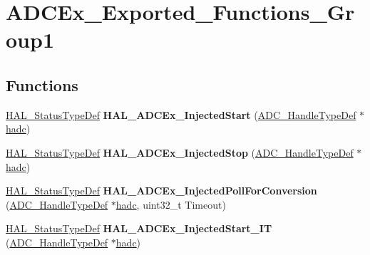 \hypertarget{group___a_d_c_ex___exported___functions___group1}{\section{A\-D\-C\-Ex\-\_\-\-Exported\-\_\-\-Functions\-\_\-\-Group1}
\label{group___a_d_c_ex___exported___functions___group1}
}
\subsection*{Functions}
\begin{DoxyCompactItemize}
\item 
\hypertarget{group___a_d_c_ex___exported___functions___group1_gaa666882ff772df8a5140090422825ed6}{\hyperlink{stm32l1xx__hal__def_8h_a63c0679d1cb8b8c684fbb0632743478f}{H\-A\-L\-\_\-\-Status\-Type\-Def} {\bfseries H\-A\-L\-\_\-\-A\-D\-C\-Ex\-\_\-\-Injected\-Start} (\hyperlink{struct_a_d_c___handle_type_def}{A\-D\-C\-\_\-\-Handle\-Type\-Def} $\ast$\hyperlink{stm32l1xx__it_8c_a62fcafba91cf315db7e0e0c8f22c656f}{hadc})}\label{group___a_d_c_ex___exported___functions___group1_gaa666882ff772df8a5140090422825ed6}

\item 
\hypertarget{group___a_d_c_ex___exported___functions___group1_ga91f6c85ae910e9baaf578a346c30c7c1}{\hyperlink{stm32l1xx__hal__def_8h_a63c0679d1cb8b8c684fbb0632743478f}{H\-A\-L\-\_\-\-Status\-Type\-Def} {\bfseries H\-A\-L\-\_\-\-A\-D\-C\-Ex\-\_\-\-Injected\-Stop} (\hyperlink{struct_a_d_c___handle_type_def}{A\-D\-C\-\_\-\-Handle\-Type\-Def} $\ast$\hyperlink{stm32l1xx__it_8c_a62fcafba91cf315db7e0e0c8f22c656f}{hadc})}\label{group___a_d_c_ex___exported___functions___group1_ga91f6c85ae910e9baaf578a346c30c7c1}

\item 
\hypertarget{group___a_d_c_ex___exported___functions___group1_ga5e11b306be79f36c71a73f2e465ad613}{\hyperlink{stm32l1xx__hal__def_8h_a63c0679d1cb8b8c684fbb0632743478f}{H\-A\-L\-\_\-\-Status\-Type\-Def} {\bfseries H\-A\-L\-\_\-\-A\-D\-C\-Ex\-\_\-\-Injected\-Poll\-For\-Conversion} (\hyperlink{struct_a_d_c___handle_type_def}{A\-D\-C\-\_\-\-Handle\-Type\-Def} $\ast$\hyperlink{stm32l1xx__it_8c_a62fcafba91cf315db7e0e0c8f22c656f}{hadc}, uint32\-\_\-t Timeout)}\label{group___a_d_c_ex___exported___functions___group1_ga5e11b306be79f36c71a73f2e465ad613}

\item 
\hypertarget{group___a_d_c_ex___exported___functions___group1_gaf55cd28b1394a0564f99e1f5069c0ed1}{\hyperlink{stm32l1xx__hal__def_8h_a63c0679d1cb8b8c684fbb0632743478f}{H\-A\-L\-\_\-\-Status\-Type\-Def} {\bfseries H\-A\-L\-\_\-\-A\-D\-C\-Ex\-\_\-\-Injected\-Start\-\_\-\-I\-T} (\hyperlink{struct_a_d_c___handle_type_def}{A\-D\-C\-\_\-\-Handle\-Type\-Def} $\ast$\hyperlink{stm32l1xx__it_8c_a62fcafba91cf315db7e0e0c8f22c656f}{hadc})}\label{group___a_d_c_ex___exported___functions___group1_gaf55cd28b1394a0564f99e1f5069c0ed1}


\end{DoxyCompactItemize}
